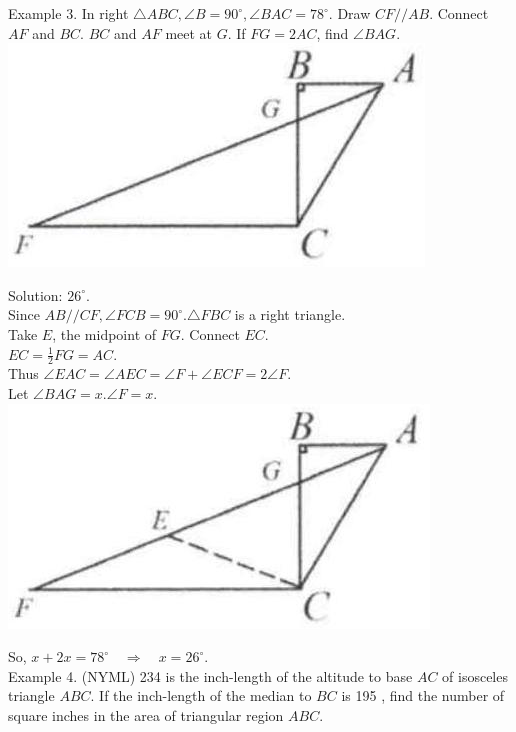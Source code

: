 \documentclass[10pt]{article}
\begin{document}
Example 3. In right \(\triangle A B C, \angle B=90^{\circ}, \angle B A C=78^{\circ}\). Draw \(C F / / A B\). Connect \(A F\) and \(B C\). \(B C\) and \(A F\) meet at \(G\). If \(F G=2 A C\), find \(\angle B A G\).\\
\includegraphics[max width=\textwidth, center]{2025_04_17_97bc1f7e44d93c271a88g-009(2)}


Solution: \(26^{\circ}\).\\
Since \(A B / / C F, \angle F C B=90^{\circ} . \triangle F B C\) is a right triangle.\\
Take \(E\), the midpoint of \(F G\). Connect \(E C\).\\
\(E C=\frac{1}{2} F G=A C\).\\
Thus \(\angle E A C=\angle A E C=\angle F+\angle E C F=2 \angle F\).\\
Let \(\angle B A G=x . \angle F=x\).\\
\includegraphics[max width=\textwidth, center]{2025_04_17_97bc1f7e44d93c271a88g-010(2)}

So, \(x+2 x=78^{\circ} \quad \Rightarrow \quad x=26^{\circ}\).\\
Example 4. (NYML) 234 is the inch-length of the altitude to base \(A C\) of isosceles triangle \(A B C\). If the inch-length of the median to \(B C\) is 195 , find the number of square inches in the area of triangular region \(A B C\).
\end{document}
